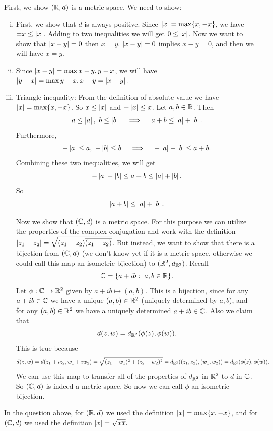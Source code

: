 \begin{solution}
	First, we show $ (\mathbb{R}, d) $ is a metric space. We need to show:
	\begin{enumerate}[(i)]
		\item First, we show that $ d $ is always positive. Since $ \left|x\right| = \max\{x,-x\} $, we have $ \pm x \leq \left|x\right| $. Adding to two inequalities we will get $ 0\leq \left|x\right| $. Now we want to show that $ \left|x-y\right|=0 $ then $ x = y $. $ \left|x-y\right| = 0 $ implies $ x-y= 0 $, and then we will have $ x=y $.
 		\item Since $ \left|x-y\right| = \max{x-y,y-x} $, we will have $ \left|y-x\right| = \max{y-x,x-y} = \left|x-y\right| $.
		\item Triangle inequality: From the definition of absolute value we have $ \left|x\right| = \max\{x,-x\} $. So $ x\leq \left|x\right| $ and $ -\left|x\right| \leq x $. Let $ a,b \in \mathbb{R} $. Then 
		\[ a\leq \left|a\right|,\ b\leq \left|b\right| \quad\implies\quad  a+b \leq \left|a\right| + \left|b\right|. \]
		Furthermore, 
		\[ -\left|a\right|\leq a,\ -\left|b\right|\leq b \quad\implies\quad -\left|a\right|-\left|b\right| \leq a+b.   \]
		Combining these two inequalities, we will get
		\[ -\left|a\right| - \left|b\right| \leq a+b \leq \left|a\right| + \left|b\right|. \]
		So
		\[ \left|a+b\right| \leq \left|a\right| + \left|b\right|. \]
		
		Now we show that $ (\mathbb{C},d)$ is a metric space. For this purpose we can utilize the properties of the complex conjugation and work with the definition  $ \left|z_1-z_2\right| = \sqrt{(z_1-z_2)\overline{(z_1-z_2)}} $. But instead, we want to show that there is a bijection from $ (\mathbb{C},d) $ (we don't know yet if it is a metric space, otherwise we could call this map an isometric bijection) to $ (\mathbb{R}^2,d_{\mathbb{R}^2}) $. Recall
		\[ \mathbb{C} = \{a+ib:\ a,b\in \mathbb{R}\}. \]
		Let $ \phi: \mathbb{C}\to\mathbb{R}^2 $ given by $ a+ib \mapsto (a,b) $. This is a bijection, since for any $ a+ib\in \mathbb{C} $ we have a unique $ (a,b)\in\mathbb{R}^2 $ (uniquely determined by $ a,b $), and for any $ (a,b)\in \mathbb{R}^2 $ we have a uniquely determined $ a+ib\in \mathbb{C} $. Also we claim that
		\[ d(z,w)  = d_{\mathbb{R}^2}(\phi(z),\phi(w)). \]
		This is true because
		\[ d(z,w) = d(z_1+iz_2, w_1+iw_2) = \sqrt{(z_1-w_1)^2+(z_2-w_2)^2} = d_{\mathbb{R}^2}((z_1,z_2),(w_1,w_2)) = d_{\mathbb{R}^2}(\phi(z),\phi(w)). \]
		We can use this map to transfer all of the properties of $ d_{\mathbb{R}^2}  $ in $ \mathbb{R}^2 $ to $ d $ in $ \mathbb{C} $. So $ (\mathbb{C},d) $ is indeed a metric space. So now we can call $ \phi $ an isometric bijection.
	\end{enumerate}
\end{solution}

\begin{remark}
	In the question above, for $ (\mathbb{R},d) $ we used the definition $ \left|x\right| = \max\{x,-x\} $, and for $ (\mathbb{C},d) $ we used the definition $ \left|x\right| = \sqrt{x\overline{x}}. $
\end{remark}


